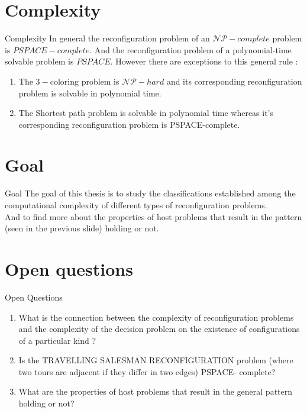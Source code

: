 
\section{Complexity}
\begin{frame}{Complexity}
In general the reconfiguration problem of an $\mathcal{NP-}complete$ problem is $PSPACE-complete$.
And the reconfiguration problem of a polynomial-time solvable problem is $PSPACE$. However there are exceptions to this general rule :
\begin{enumerate}
    \item The $3-$coloring problem is $\mathcal{NP-}hard$ and its corresponding reconfiguration problem is solvable in polynomial time.
    \item The Shortest path problem is solvable in polynomial time whereas it's corresponding reconfiguration problem is PSPACE-complete.
\end{enumerate}
\end{frame}

\section{Goal}
\begin{frame}{Goal}
The goal of this thesis is to study the classifications established among the computational complexity of different
types of reconfiguration problems. \\
And to find more about the properties of host problems that result in the pattern (seen in the previous slide) holding or not.
\end{frame}

\section{Open questions}
\begin{frame}{Open Questions}
  \begin{enumerate}
    \item What is the connection between the complexity of reconfiguration problems and the complexity of the decision problem on the existence of configurations of a particular kind ?
    \item Is the TRAVELLING SALESMAN RECONFIGURATION problem (where two tours are adjacent if they differ in two edges) PSPACE-
    complete?
    \item What are the properties of host problems that result in the general pattern holding or not?
  \end{enumerate}

\end{frame}